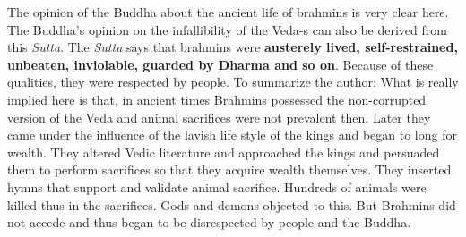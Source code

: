 The opinion of the Buddha about the ancient life of brahmins is very clear here. The Buddha’s opinion on the infallibility of the Veda-s can also be derived from this \textit{Sutta}. The \textit{Sutta} says that brahmins were \textbf{austerely lived, self-restrained, unbeaten, inviolable, guarded by Dharma and so on}. Because of these qualities, they were respected by people. To summarize the author: What is really implied here is that, in ancient times Brahmins possessed the non-corrupted version of the Veda and animal sacrifices were not prevalent then. Later they came under the influence of the lavish life style of the kings and began to long for wealth. They altered Vedic literature and approached the kings and persuaded them to perform sacrifices so that they acquire wealth themselves. They inserted hymns that support and validate animal sacrifice. Hundreds of animals were killed thus in the sacrifices. Gods and demons objected to this. But Brahmins did not accede and thus began to be disrespected by people and the Buddha.

